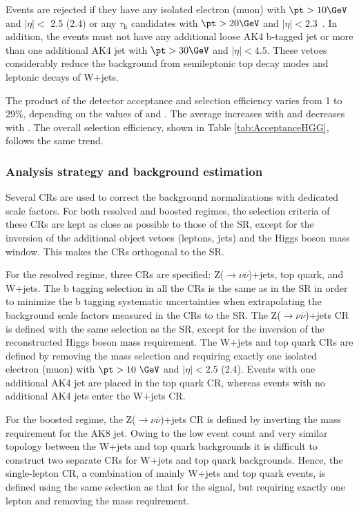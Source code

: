 Events are rejected if they have any  
isolated electron (muon) with $\pt > 10\GeV$ and $|\eta| < $ 2.5 (2.4) or any $\tau_\mathrm{h}$ candidates with $\pt > 20\GeV$ and $|\eta| < 2.3$~\cite{Khachatryan:2015hwa,Chatrchyan:2013sba,CMSTauJINST}. 
In addition, the events must not have any additional loose AK4 b-tagged jet or 
more than one additional AK4 jet with $\pt > 30\GeV$ and $|\eta| < 4.5$. 
These vetoes considerably reduce the background from semileptonic top decay 
modes and leptonic decays of W+jets. 

The product of the detector acceptance and selection efficiency varies from 
1 to 29\%, depending on the values of 
\mzp and \maz. The average \MET increases with \mzp and decreases with \maz. 
The overall selection efficiency, shown in Table \ref{tab:AcceptanceHGG}, 
follows the same trend.

\subsubsection{Analysis strategy and background estimation}

Several CRs are used to 
correct the background normalizations with dedicated scale factors. For both resolved and boosted regimes, the selection criteria of these CRs are kept as close as possible to those of the SR, except for the inversion of the additional 
object vetoes (leptons, jets) and the Higgs boson mass window.
This makes the CRs orthogonal to the SR.

For the resolved regime, three CRs are specified: Z($\rightarrow\nu\overline{\nu}$)+jets, 
top quark, and W+jets.
The b tagging selection in all the CRs is the same as in the SR in order to minimize the b tagging systematic uncertainties
when extrapolating the background scale factors measured in the CRs to the SR. 
The Z($\rightarrow\nu\overline{\nu}$)+jets CR is defined with the same selection as the 
SR, except for the inversion of the reconstructed Higgs boson mass requirement. 
The W+jets and top quark CRs are defined by removing the mass selection and 
requiring exactly one isolated electron (muon) with $\pt > 10~\GeV$ and 
$|\eta|< 2.5$ (2.4). 
Events with one additional AK4 jet are placed in the top quark CR, whereas 
events with no additional AK4 jets enter the W+jets CR. 

For the boosted regime, the Z($\rightarrow\nu\overline{\nu}$)+jets CR is defined by inverting the mass requirement for the AK8 jet. 
Owing to the low event count and very similar topology between the W+jets and top 
quark backgrounds it is difficult to 
construct two separate CRs for W+jets and top quark backgrounds. 
Hence, the single-lepton CR, a combination of mainly W+jets and top quark 
events, is defined using the same selection as that for the signal, but 
requiring exactly one lepton and removing the mass requirement. 

